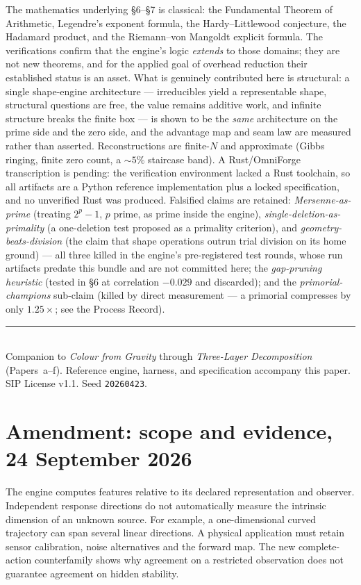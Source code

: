 \documentclass[11pt]{article}
\begin{document}
The mathematics underlying \S6--\S7 is classical: the Fundamental Theorem of Arithmetic, Legendre's
exponent formula, the Hardy--Littlewood conjecture, the Hadamard product, and the Riemann--von Mangoldt
explicit formula. The verifications confirm that the engine's logic \emph{extends} to those domains; they
are not new theorems, and for the applied goal of overhead reduction their established status is an asset.
What is genuinely contributed here is structural: a single shape-engine architecture --- irreducibles yield
a representable shape, structural questions are free, the value remains additive work, and infinite structure
breaks the finite box --- is shown to be the \emph{same} architecture on the prime side and the zero side,
and the advantage map and seam law are measured rather than asserted. Reconstructions are finite-$N$ and
approximate (Gibbs ringing, finite zero count, a $\sim\!5\%$ staircase band). A Rust/OmniForge transcription
is pending: the verification environment lacked a Rust toolchain, so all artifacts are a Python reference
implementation plus a locked specification, and no unverified Rust was produced. Falsified claims are
retained: \emph{Mersenne-as-prime} (treating $2^p-1$, $p$ prime, as prime inside the engine),
\emph{single-deletion-as-primality} (a one-deletion test proposed as a primality criterion), and
\emph{geometry-beats-division} (the claim that shape operations outrun trial division on its home
ground) --- all three killed in the engine's pre-registered test rounds, whose run artifacts predate
this bundle and are not committed here; the \emph{gap-pruning heuristic} (tested in \S6 at
correlation $-0.029$ and discarded); and the \emph{primorial-champions} sub-claim (killed by direct
measurement --- a primorial compresses by only $1.25\times$; see the Process Record).

\vspace{1em}
\noindent\rule{\linewidth}{0.4pt}\\
\small Companion to \textit{Colour from Gravity} through \textit{Three-Layer Decomposition} (Papers~a--f). Reference engine, harness, and specification accompany this paper.
SIP License v1.1. Seed \texttt{20260423}.


\section*{Amendment: scope and evidence, 24 September 2026}
The engine computes features relative to its declared representation and observer. Independent response directions do not automatically measure the intrinsic dimension of an unknown source. For example, a one-dimensional curved trajectory can span several linear directions. A physical application must retain sensor calibration, noise alternatives and the forward map. The new complete-action counterfamily shows why agreement on a restricted observation does not guarantee agreement on hidden stability.
\end{document}
